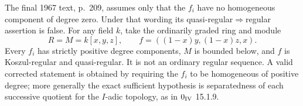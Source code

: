 \begin{example}\label{SA23-D-6}
The final 1967 text, p.~209, assumes only that the $f_i$ have no
homogeneous component of degree zero.  Under that wording its
quasi-regular$\Rightarrow$regular assertion is false.  For any field
$k$, take the ordinarily graded ring and module
\[
 R=M=k[x,y,z],\qquad f=((1-x)y,(1-x)z,x).
\]
Every $f_i$ has strictly positive degree components, $M$ is bounded
below, and $f$ is Koszul-regular and quasi-regular.  It is not an
ordinary regular sequence.  A valid corrected statement is obtained
by requiring the $f_i$ to be homogeneous of positive degree; more
generally the exact sufficient hypothesis is separatedness of each
successive quotient for the $I$-adic topology, as in
$0_{\rm IV}$ 15.1.9.
\end{example}

